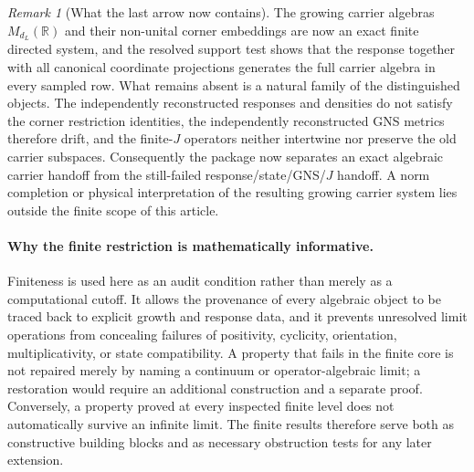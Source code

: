\documentclass[11pt]{article}
\theoremstyle{remark}
\newtheorem{remark}[definition]{Remark}
\newcommand{\R}{\mathbb{R}}
\numberwithin{equation}{section}
\begin{document}
\begin{remark}[What the last arrow now contains]
The growing carrier algebras
\(M_{d_L}(\R)\) and their non-unital corner embeddings are now an exact finite directed system, and the resolved support test shows that the response together with all canonical coordinate projections generates the full carrier algebra in every sampled row.  What remains absent is a natural family of the distinguished objects.  The independently reconstructed responses and densities do not satisfy the corner restriction identities, the independently reconstructed GNS metrics therefore drift, and the finite-\(J\) operators neither intertwine nor preserve the old carrier subspaces.  Consequently the package now separates an exact algebraic carrier handoff from the still-failed response/state/GNS/\(J\) handoff.  A norm completion or physical interpretation of the resulting growing carrier system lies outside the finite scope of this article.
\end{remark}


\paragraph{Why the finite restriction is mathematically informative.}
Finiteness is used here as an audit condition rather than merely as a computational cutoff. It allows the provenance of every algebraic object to be traced back to explicit growth and response data, and it prevents unresolved limit operations from concealing failures of positivity, cyclicity, orientation, multiplicativity, or state compatibility. A property that fails in the finite core is not repaired merely by naming a continuum or operator-algebraic limit; a restoration would require an additional construction and a separate proof. Conversely, a property proved at every inspected finite level does not automatically survive an infinite limit. The finite results therefore serve both as constructive building blocks and as necessary obstruction tests for any later extension.
\end{document}
